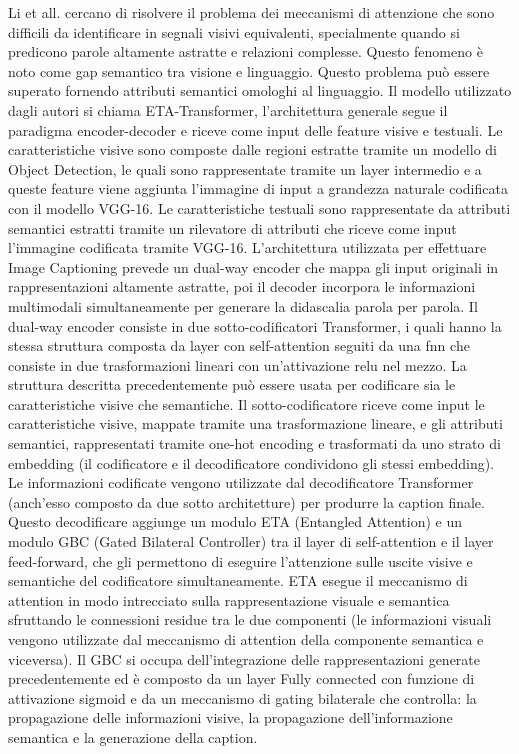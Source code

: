 Li et all. \cite{li2019entangled} cercano di risolvere il problema dei meccanismi di attenzione che sono difficili da identificare in segnali visivi equivalenti, specialmente quando si predicono parole altamente astratte e relazioni complesse. Questo fenomeno è noto come gap semantico tra visione e linguaggio. Questo problema può essere superato fornendo attributi semantici omologhi al linguaggio.
Il modello utilizzato dagli autori si chiama ETA-Transformer, l'architettura generale segue il paradigma encoder-decoder e riceve come input delle feature visive e testuali.
Le caratteristiche visive sono composte dalle regioni estratte tramite un modello di Object Detection, le quali sono rappresentate tramite un layer intermedio e a queste feature viene aggiunta l'immagine di input a grandezza naturale codificata con il modello VGG-16.
Le caratteristiche testuali sono rappresentate da attributi semantici estratti tramite un rilevatore di attributi che riceve come input l'immagine codificata tramite VGG-16.
L'architettura utilizzata per effettuare Image Captioning prevede un dual-way encoder che mappa gli input originali in rappresentazioni altamente astratte, poi il decoder incorpora le informazioni multimodali simultaneamente per generare la didascalia parola per parola.
Il dual-way encoder consiste in due sotto-codificatori Transformer, i quali hanno la stessa struttura composta da layer con self-attention seguiti da una \acrfull{fnn} che consiste in due trasformazioni lineari con un'attivazione \acrshort{relu} nel mezzo.
La struttura descritta precedentemente può essere usata per codificare sia le caratteristiche visive che semantiche. Il sotto-codificatore riceve come input le caratteristiche visive, mappate tramite una trasformazione lineare, e gli attributi semantici, rappresentati tramite one-hot encoding e trasformati da uno strato di embedding (il codificatore e il decodificatore condividono gli stessi embedding).
Le informazioni codificate vengono utilizzate dal decodificatore Transformer (anch'esso composto da due sotto architetture) per produrre la caption finale.
Questo decodificare aggiunge un modulo ETA (Entangled Attention) e un modulo GBC (Gated Bilateral Controller) tra il layer di self-attention e il layer feed-forward, che gli permettono di eseguire l'attenzione sulle uscite visive e semantiche del codificatore simultaneamente. 
ETA esegue il meccanismo di attention in modo intrecciato sulla rappresentazione visuale e semantica sfruttando le connessioni residue tra le due componenti (le informazioni visuali vengono utilizzate dal meccanismo di attention della componente semantica e viceversa).
Il GBC si occupa dell'integrazione delle rappresentazioni generate precedentemente ed è composto da un layer Fully connected con funzione di attivazione sigmoid e da un meccanismo di gating bilaterale che controlla: la propagazione delle informazioni visive, la propagazione dell'informazione semantica e la generazione della caption.

